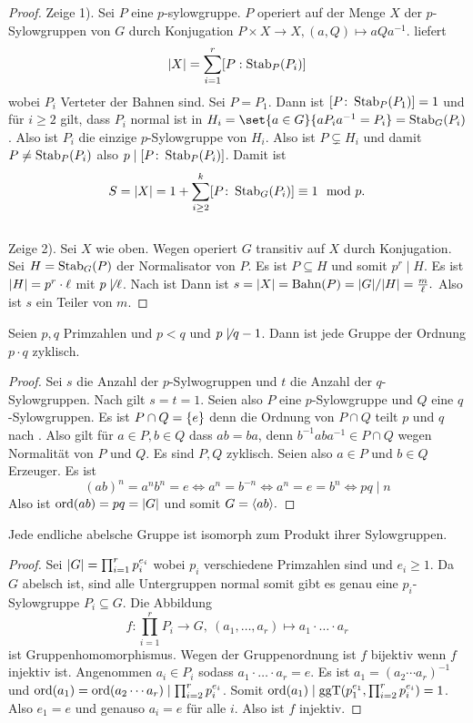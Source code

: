 \begin{proof}
    Zeige 1). Sei \(P\) eine \(p\)-sylowgruppe. \(P\) operiert auf der Menge \(X\) der \(p\)-Sylowgruppen von \(G\) durch Konjugation \(P\times X\to X, (a,Q)\mapsto aQa^{-1}\).
     liefert
    \[\lvert X\rvert=\sum_{i=1}^r[P:\operatorname{Stab}_P(P_i)]\] wobei \(P_i\) Verteter der Bahnen sind. Sei \(P=P_1\). Dann ist \([P\colon\operatorname{Stab}_P(P_1)]=1\) und für \(i\geq 2\) gilt, dass \(P_i\) normal ist in \(H_i=\set{a\in G}{aP_ia^{-1}=P_i}=\Stab_G(P_i)\). Also ist \(P_i\) die einzige \(p\)-Sylowgruppe von \(H_i\). Also ist \(P\subsetneq H_i\) und damit \(P\neq \operatorname{Stab}_P(P_i)\) also \(p\mid [P\colon\operatorname{Stab}_P(P_i)]\). Damit ist \[S=\lvert X\rvert=1+\sum_{i\geq 2}^k[P\colon \operatorname{Stab}_G(P_i)]\equiv 1\mod p.\]\\
    Zeige 2). Sei \(X\) wie oben. Wegen  operiert \(G\) transitiv auf \(X\) durch Konjugation.
    Sei \(H=\operatorname{Stab}_G(P)\) der Normalisator von \(P\). Es ist \(P\subseteq H\) und somit \(p^r\mid H\). Es ist \(\lvert H\rvert=p^r\cdot \ell\) mit \(p\not\mid \ell\). Nach  ist
    Dann ist \(s=\lvert X\rvert=\text{Bahn}(P)=\lvert G\rvert/\lvert H\rvert=\frac{m}{\ell}.\) Also ist \(s\) ein Teiler von \(m\).
\end{proof}
\begin{Satz}
    Seien \(p,q\) Primzahlen und \(p<q\)  und \(p\not\mid q-1\). Dann ist jede Gruppe der Ordnung \(p\cdot q\) zyklisch.
\end{Satz}
\begin{proof}
    Sei \(s\) die Anzahl der \(p\)-Sylwogruppen und \(t\) die Anzahl der \(q\)-Sylowgruppen. Nach  gilt \(s=t=1.\) Seien also \(P\) eine \(p\)-Sylowgruppe und \(Q\) eine \(q\)-Sylowgruppen.
    Es ist \(P\cap Q=\{e\}\) denn die Ordnung von \(P\cap Q\) teilt \(p\) und \(q\) nach . Also gilt für \(a\in P, b\in Q\) dass \(ab=ba\), denn \(b^{-1}aba^{-1}\in P\cap Q\) wegen Normalität von \(P\) und \(Q\). Es sind \(P,Q\) zyklisch. Seien also \(a\in P\) und \(b\in Q\) Erzeuger. Es ist 
    \[(ab)^n=a^nb^n=e\iff a^n=b^{-n}\iff a^n=e=b^n\iff pq\mid n\]
    Also ist \(\operatorname{ord}(ab)=pq=\lvert G\rvert\) und somit \(G=\langle ab\rangle.\)
\end{proof}
\begin{Lemma}
    Jede endliche abelsche Gruppe ist isomorph zum Produkt ihrer Sylowgruppen.
\end{Lemma}
\begin{proof}
    Sei \(\lvert G\rvert=\prod_{i=1}^rp_i^{e_i}\) wobei \(p_i\) verschiedene Primzahlen sind und \(e_i\geq 1\).
    Da \(G\) abelsch ist, sind alle Untergruppen normal somit gibt es genau eine \(p_i\)-Sylowgruppe \(P_i\subseteq G\). Die Abbildung 
    \[f\colon\prod_{i=1}^rP_i\to G,\ (a_1,\dots,a_r)\mapsto a_1\cdot\dots\cdot a_r\] 
    ist Gruppenhomomorphismus. Wegen der Gruppenordnung ist \(f\) bijektiv wenn \(f\) 
    injektiv ist. Angenommen \(a_i\in P_i\) sodass \(a_1\cdot\dots\cdot a_r=e\).
     Es ist \(a_1=(a_2\cdots a_r)^{-1}\) und 
     \(\operatorname{ord}(a_1)=\operatorname{ord}(a_2\cdots a_r)\mid\prod_{i=2}^rp_i^{e_i}\).
    Somit \(\operatorname{ord}(a_1)\mid \operatorname{ggT}(p_1^{e_1},\prod_{i=2}^rp_i^{e_i})=1\). Also \(e_1=e\) und genauso \(a_i=e\) für alle \(i\). Also ist \(f\) injektiv.
\end{proof}
